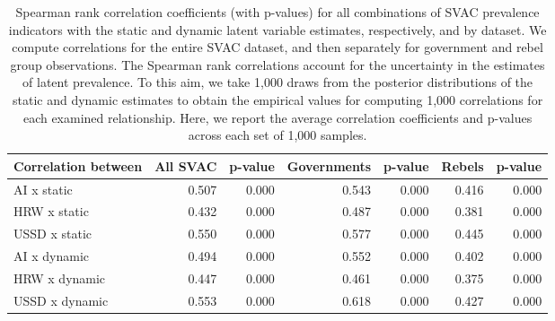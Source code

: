 \begin{table}[h]
\centering
\caption{Spearman rank correlation coefficients (with p-values) 
                              for all combinations of SVAC prevalence indicators with the static and dynamic latent 
                              variable estimates, respectively, 
                              and by dataset. We compute correlations for the entire SVAC dataset, and then separately  for  
                              government and rebel group observations.
                              The Spearman rank correlations account for the uncertainty in the estimates of latent prevalence.
                              To this aim, we take 1,000 draws from the posterior distributions of the static and dynamic estimates to obtain
                              the empirical values for computing 1,000 correlations for each examined relationship. Here, we report
                              the average  correlation coefficients and p-values across each set of 1,000 samples.} 
\label{xt-corr-spearman-obs-estimates}
\begin{tabular}{lrrrrrr}
  \hline
Correlation between & All SVAC & p-value & Governments & p-value & Rebels & p-value \\ 
  \hline
AI x static & 0.507 & 0.000 & 0.543 & 0.000 & 0.416 & 0.000 \\ 
  HRW x static & 0.432 & 0.000 & 0.487 & 0.000 & 0.381 & 0.000 \\ 
  USSD x static & 0.550 & 0.000 & 0.577 & 0.000 & 0.445 & 0.000 \\ 
   \hline
AI x dynamic & 0.494 & 0.000 & 0.552 & 0.000 & 0.402 & 0.000 \\ 
  HRW x dynamic & 0.447 & 0.000 & 0.461 & 0.000 & 0.375 & 0.000 \\ 
  USSD x dynamic & 0.553 & 0.000 & 0.618 & 0.000 & 0.427 & 0.000 \\ 
   \hline
\end{tabular}
\end{table}
